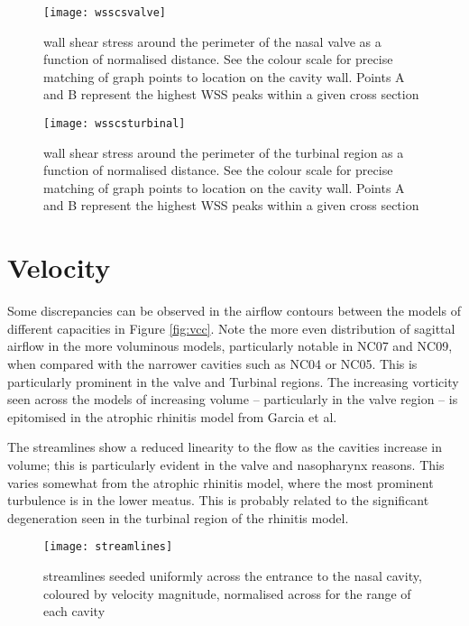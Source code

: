 \begin{figure} 
  \texttt{[image: wsscsvalve]}
  \caption{wall shear stress around the perimeter of the nasal valve as a function of normalised distance. See the colour scale for precise matching of graph points to location on the cavity wall. Points A and B represent the highest WSS peaks within a given cross section}
  \label{fig:wcs}
\end{figure}

\begin{figure} 
  \texttt{[image: wsscsturbinal]}
  \caption{wall shear stress around the perimeter of the turbinal region as a function of normalised distance. See the colour scale for precise matching of graph points to location on the cavity wall. Points A and B represent the highest WSS peaks within a given cross section}
  \label{fig:wcst}
\end{figure}

\section{Velocity}

Some discrepancies can be observed in the airflow contours between the models of different capacities in Figure \ref{fig:vcc}. Note the more even distribution of sagittal airflow in the more voluminous models, particularly notable in NC07 and NC09, when compared with the narrower cavities such as NC04 or NC05. This is particularly prominent in the valve and Turbinal regions. The increasing vorticity seen across the models of increasing volume – particularly in the valve region – is epitomised in the atrophic rhinitis model from Garcia et al\cite{Garcia2007}.

The streamlines show a reduced linearity to the flow as the cavities increase in volume; this is particularly evident in the valve and nasopharynx reasons. This varies somewhat from the atrophic rhinitis model, where the most prominent turbulence is in the lower meatus. This is probably related to the significant degeneration seen in the turbinal region of the rhinitis model.

\begin{figure} 
  \texttt{[image: streamlines]}
  \caption{streamlines seeded uniformly across the entrance to the nasal cavity, coloured by velocity magnitude, normalised across for the range of each cavity}
  \label{fig:vsl}
\end{figure}


